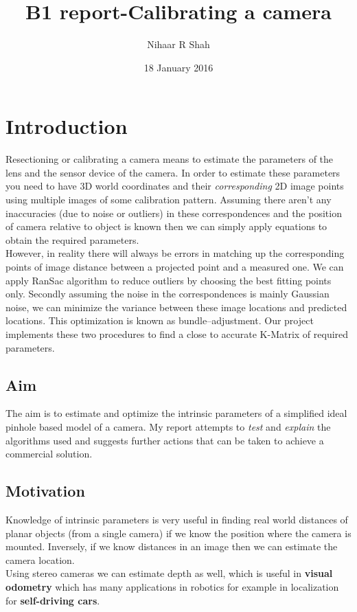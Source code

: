 \documentclass[titlepage]{article}
\title{B1 report-Calibrating a camera}
\author{Nihaar R Shah}
\date{18 January 2016}
\begin{document}
\maketitle
\doublespacing
\section{Introduction}
Resectioning or calibrating a camera means to estimate the parameters of the lens and the sensor device of the camera. In order to estimate these parameters you need to have 3D world coordinates and their \textit{corresponding} 2D image points using multiple images of some calibration pattern. Assuming there aren't any inaccuracies (due to noise or outliers) in these correspondences and the position of camera relative to object is known then we can simply apply equations to obtain the required parameters. \\
However, in reality there will always be errors in matching up the corresponding points of image distance between a projected point and a measured one. We can apply RanSac algorithm to reduce outliers by choosing the best fitting points only. Secondly assuming the noise in the correspondences is mainly Gaussian noise, we can minimize the variance between these image locations and predicted locations. This optimization is known as bundle–adjustment. Our project implements these two procedures to find a close to accurate K-Matrix of required parameters.
\subsection{Aim}
The aim is to estimate and optimize the intrinsic parameters of a simplified ideal pinhole based model of a camera. My report attempts to \textit{test} and \textit{explain} the algorithms used and suggests further actions that can be taken to achieve a commercial solution.
\subsection{Motivation}
Knowledge of intrinsic parameters is very useful in finding real world distances of planar objects (from a single camera) if we know the position where the camera is mounted. Inversely, if we know distances in an image then we can estimate the camera location.\\
Using stereo cameras we can estimate depth as well, which is useful in \textbf{visual odometry} which has many applications in robotics for example in localization for \textbf{self-driving cars}.
\end{document}
